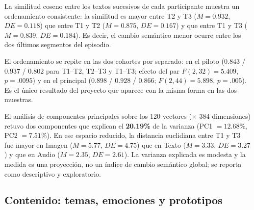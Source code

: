 \documentclass[12pt]{article}
\begin{document}
La similitud coseno entre los textos sucesivos de cada participante muestra un ordenamiento
consistente: la similitud es mayor entre T2 y T3 ($M = 0.932$, $DE = 0.118$) que entre T1 y T2
($M = 0.875$, $DE = 0.167$) y que entre T1 y T3 ($M = 0.839$, $DE = 0.184$). Es decir, el cambio
semántico menor ocurre entre los dos últimos segmentos del episodio.

El ordenamiento se repite en las dos cohortes por separado: en el piloto
($0.843$ / $0.937$ / $0.802$ para T1--T2, T2--T3 y T1--T3; efecto del par
$F(2,32) = 5.409$, $p = .0095$) y en el principal ($0.898$ / $0.928$ / $0.866$;
$F(2,44) = 5.898$, $p = .005$). Es el único resultado del proyecto que aparece con la misma
forma en las dos muestras.

El análisis de componentes principales sobre los 120 vectores ($\times$ 384 dimensiones) retuvo
dos componentes que explican el \textbf{20.19\%} de la varianza (PC1 $= 12.68\%$,
PC2 $= 7.51\%$). En ese espacio reducido, la distancia euclidiana entre T1 y T3 fue mayor en
Imagen ($M = 5.77$, $DE = 4.75$) que en Texto ($M = 3.33$, $DE = 3.27$) y que en Audio
($M = 2.35$, $DE = 2.61$). La varianza explicada es modesta y la medida es una proyección, no un
índice de cambio semántico global; se reporta como descriptivo y exploratorio.

\subsection{Contenido: temas, emociones y prototipos}
\end{document}

